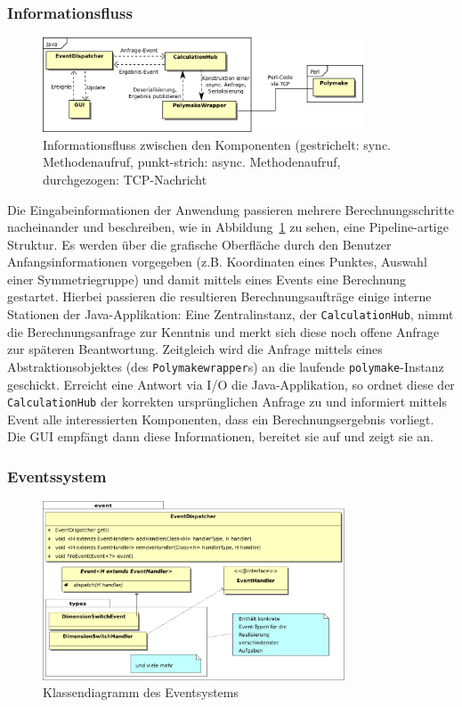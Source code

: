     \subsubsection{Informationsfluss\label{ssec:flow}}
        \begin{figure}[tbh]
            \centering
            \includegraphics[width=0.85\textwidth]{img/flow}
            \caption{Informationsfluss zwischen den Komponenten
                      {\scriptsize(gestrichelt: sync. Methodenaufruf, punkt-strich: async. Methodenaufruf, durchgezogen: TCP-Nachricht}\label{fig:flow}}
        \end{figure}

        \noindent Die Eingabeinformationen der Anwendung passieren mehrere Berechnungsschritte nacheinander und beschreiben, wie in Abbildung~\ref{fig:flow} zu sehen, eine Pipeline-artige Struktur.
        Es werden über die grafische Oberfläche durch den Benutzer Anfangsinformationen vorgegeben (z.B. Koordinaten eines Punktes, Auswahl einer Symmetriegruppe)
        und damit mittels eines Events eine Berechnung gestartet. Hierbei passieren die resultieren Berechnungsaufträge einige interne Stationen der Java-Applikation:
        Eine Zentralinstanz, der \texttt{CalculationHub}, nimmt die Berechnungsanfrage zur Kenntnis und merkt sich diese noch offene Anfrage zur späteren Beantwortung.
        Zeitgleich wird die Anfrage mittels eines Abstraktionsobjektes (des \texttt{Polymakewrapper}s) an die laufende \texttt{polymake}-Instanz geschickt.
        Erreicht eine Antwort via I/O die Java-Applikation, so ordnet diese der \texttt{CalculationHub} der korrekten ursprünglichen Anfrage zu und informiert mittels Event alle
        interessierten Komponenten, dass ein Berechnungsergebnis vorliegt.
        Die GUI empfängt dann diese Informationen, bereitet sie auf und zeigt sie an.

    \subsubsection{Eventssystem\label{ssec:event}}
        \begin{figure}[bht]
            \centering
            \includegraphics[width=0.8\textwidth]{img/event_classdiagram2}
            \caption{Klassendiagramm des Eventsystems}
        \end{figure}
